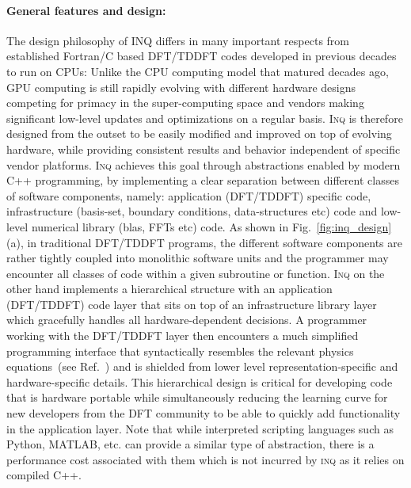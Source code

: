 \paragraph{General features and design:}
The design philosophy of INQ differs in many important respects from established Fortran/C based DFT/TDDFT codes developed in previous decades to run on CPUs: Unlike the CPU computing model that matured decades ago, GPU computing is still rapidly evolving with different hardware designs competing for primacy in the super-computing space and vendors making significant low-level updates and optimizations on a regular basis.
\textsc{Inq} is therefore designed from the outset to be easily modified and improved on top of evolving hardware, while providing consistent results and behavior independent of specific vendor platforms. 
\textsc{Inq} achieves this goal through abstractions enabled by modern C++ programming, by implementing a clear separation between different classes of software components, namely: application (DFT/TDDFT) specific code, infrastructure (basis-set, boundary conditions, data-structures etc) code and low-level numerical library (blas, FFTs etc) code. 
\newline 
\newline
As shown in Fig.~\ref{fig:inq_design}(a), in traditional DFT/TDDFT programs, the different software components are rather tightly coupled into monolithic software units and the programmer may encounter all classes of code within a given subroutine or function. 
\textsc{Inq} on the other hand implements a hierarchical structure with an application (DFT/TDDFT) code layer that sits on top of an infrastructure library layer which gracefully handles all hardware-dependent decisions. 
A programmer working with the DFT/TDDFT layer then encounters a much simplified programming interface that syntactically resembles the relevant physics equations~(see Ref.~\cite{Andrade2021}) and is shielded from lower level representation-specific and hardware-specific details. 
This hierarchical design is critical for developing code that is hardware portable while simultaneously reducing the learning curve for new developers from the DFT community to be able to quickly add functionality in the application layer. 
Note that while interpreted scripting languages such as Python, MATLAB, etc. can provide a similar type of abstraction, there is a performance cost associated with them which is not incurred by \textsc{inq} as it relies on compiled C++.

